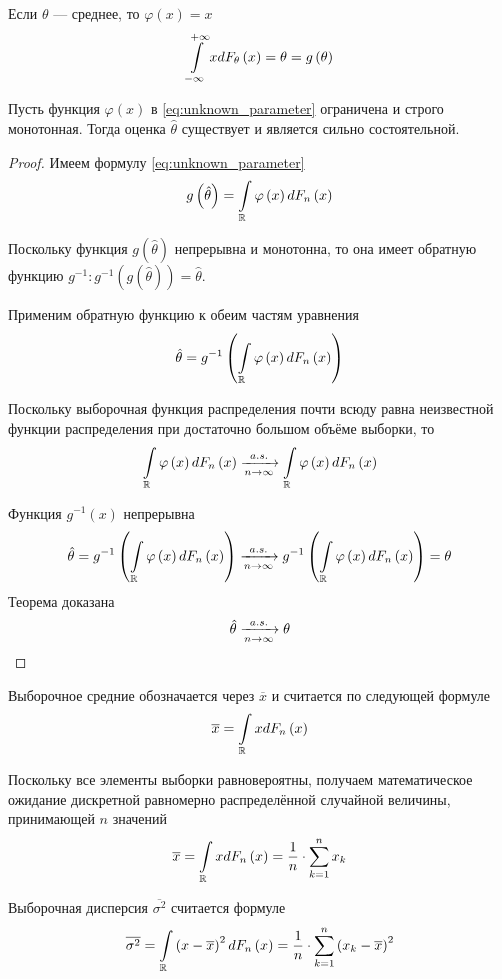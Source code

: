 \begin{example} Если $\theta$ --- среднее, то $\varphi\left(x\right)=x$
$$\int\limits_{-\infty}^{+\infty}xdF_{\theta}\left(x\right)
    =\theta=g\left(\theta\right)$$
\end{example}
\begin{theorem}Пусть функция $\varphi\left( x \right)$
    в \eqref{eq:unknown_parameter} ограничена и строго монотонная.
    Тогда оценка $\hat{\theta}$ существует и является сильно состоятельной.
\end{theorem}
\begin{proof}
    Имеем формулу \eqref{eq:unknown_parameter}
    $$g\left(\hat{\theta}\right)
            =\int\limits_{\mathbb{R}}\varphi\left(x\right)dF_n\left(x\right)$$

    Поскольку функция $g\left(\hat{\theta}\right)$ непрерывна и монотонна,
    то она имеет обратную функцию
    $g^{-1}:g^{-1}\left(g\left(\hat{\theta}\right)\right)=\hat{\theta}$.

    Применим обратную функцию к обеим частям уравнения
    $$\hat{\theta}
            =g^{-1}\left(
                \int\limits_{\mathbb{R}}\varphi\left(x\right)dF_n\left(x\right)\right)$$

    Поскольку выборочная функция распределения почти всюду равна
    неизвестной функции распределения при достаточно большом объёме выборки,
    то
    $$\int\limits_{\mathbb{R}}\varphi\left(x\right)dF_n\left(x\right)\xrightarrow[n\to\infty]{a.s.}
        \int\limits_{\mathbb{R}}\varphi\left(x\right)dF_n\left(x\right)$$

    Функция $g^{-1}\left(x\right)$ непрерывна
    $$\hat{\theta}
        =g^{-1}\left(
            \int\limits_{\mathbb{R}}\varphi\left(x\right)dF_n\left(x\right)\right)
        \xrightarrow[n\to\infty]{a.s.} g^{-1}\left(
            \int\limits_{\mathbb{R}}\varphi\left(x\right)dF_n\left(x\right)\right)
        =\theta$$
    Теорема доказана
    $$\hat{\theta}\xrightarrow[n\to\infty]{a.s.}\theta$$
\end{proof}
\begin{definition}
    Выборочное средние обозначается через $\overline{x}$
    и считается по следующей формуле
    $$\overline{x}=\int\limits_{\mathbb{R}}xdF_n\left(x\right)$$

    Поскольку все элементы выборки равновероятны,
    получаем математическое ожидание
    дискретной равномерно распределённой случайной величины,
    принимающей $n$ значений
    $$\overline{x}=\int\limits_{\mathbb{R}}xdF_n\left(x\right)
        =\frac{1}{n}\cdot\sum_{k=1}^n x_k$$
\end{definition}
\begin{definition}
    Выборочная дисперсия $\overline{\sigma^2}$
    считается формуле
    $$\overline{\sigma^2}
        =\int\limits_{\mathbb{R}}\left(x-\overline{x}\right)^2dF_n\left(x\right)
        =\frac{1}{n}\cdot\sum_{k=1}^n \left(x_k-\overline{x}\right)^2$$
\end{definition}

